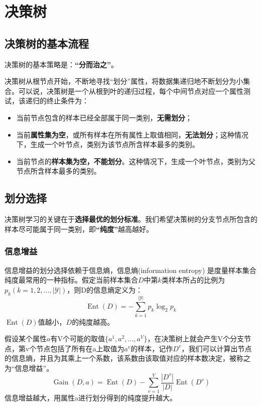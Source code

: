 \chapter{决策树}

\section{决策树的基本流程}\label{sec:6.1}
决策树的基本策略是：\textbf{“分而治之”}。

决策树从根节点开始，不断地寻找“划分”属性，将数据集递归地不断划分为小集合。可以说，决策树是一个从根到叶的递归过程，每个中间节点对应一个属性测试，该递归的终止条件为：

\begin{itemize}
    \item 当前节点包含的样本已经全部属于同一类别，\textbf{无需划分}；
    \item 当前\textbf{属性集为空}，或所有样本在所有属性上取值相同，\textbf{无法划分}；这种情况下，生成一个叶节点，类别为该节点所含样本最多的类别。
    \item 当前节点的\textbf{样本集为空，不能划分}。这种情况下，生成一个叶节点，类别为父节点所含样本最多的类别。
\end{itemize}
\section{划分选择}\label{sec:6.2}
决策树学习的关键在于\textbf{选择最优的划分标准}。我们希望决策树的分支节点所包含的样本尽可能属于同一类别，即\textbf{“纯度”}越高越好。

\subsection{信息增益}
信息增益的划分选择依赖于信息熵，信息熵(information entropy) 是度量样本集合纯度最常用的一种指标。假定当前样本集合$D$中第$k$类样本所占的比例为$p_k (k = 1,2,. . . , |\mathcal{Y}|)$，则D的信息熵定义为：
\[
\operatorname{Ent}(D)=-\sum_{k=1}^{\mid \mathcal{Y |}} p_{k} \log _{2} p_{k}
\]
$\operatorname{Ent}(D)$值越小，$D$的纯度越高。

假设某个属性$a$有V个可能的取值$\{a^1,a^2,...,a^V\}$，在决策树上就会产生V个分支节点，第v个节点包括了所有在a上取值为$a^v$的样本，记作$D^v$，我们可以计算出节点的信息熵，并且为其乘上一个系数，该系数由该取值对应的样本数决定，被称之为“信息增益”。
\[
\operatorname{Gain}(D, a)=\operatorname{Ent}(D)-\sum_{v=1}^{V} \frac{\left|D^{v}\right|}{|D|} \operatorname{Ent}\left(D^{v}\right)
\]
信息增益越大，用属性a进行划分得到的纯度提升越大。

